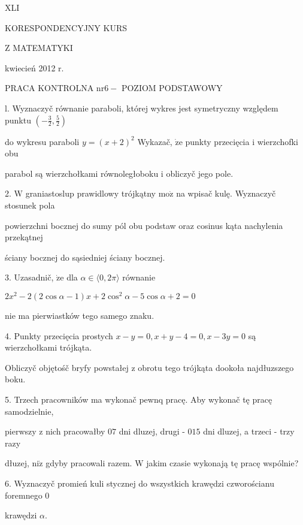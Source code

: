 \documentclass[a4paper,12pt]{article}
\begin{document}
XLI

KORESPONDENCYJNY KURS

Z MATEMATYKI

kwiecień 2012 r.

PRACA KONTROLNA $\mathrm{n}\mathrm{r} 6-$ POZIOM PODSTAWOWY

l. Wyznaczyč równanie paraboli, której wykres jest symetryczny względem punktu $(-\displaystyle \frac{3}{2},\frac{5}{2})$

do wykresu paraboli $y = (x+2)^{2}$ Wykazač, $\dot{\mathrm{z}}\mathrm{e}$ punkty przecięcia $\mathrm{i}$ wierzchofki obu

parabol są wierzchołkami równoległoboku $\mathrm{i}$ obliczyč jego pole.

2. $\mathrm{W}$ graniastoslup prawidlowy trójkątny $\mathrm{m}\mathrm{o}\dot{\mathrm{z}}$ na wpisač kulę. Wyznaczyč stosunek pola

powierzchni bocznej do sumy pól obu podstaw oraz cosinus kąta nachylenia przekątnej

ściany bocznej do sąsiedniej ściany bocznej.

3. Uzasadnič, $\dot{\mathrm{z}}\mathrm{e}$ dla $\alpha\in\langle 0,  2\pi\rangle$ równanie

$2x^{2}-2(2\cos\alpha-1)x+2\cos^{2}\alpha-5\cos\alpha+2=0$

nie ma pierwiastków tego samego znaku.

4. Punkty przecięcia prostych $x-y=0, x+y-4=0, x-3y=0$ są wierzchołkami trójkąta.

Obliczyč objętośč bryfy powstałej $\mathrm{z}$ obrotu tego trójkąta dookoła najdłuzszego boku.

5. Trzech pracowników ma wykonač pewnq pracę. Aby wykonač tę pracę samodzielnie,

pierwszy $\mathrm{z}$ nich pracowałby $07$ dni dluzej, drugi - $015$ dni dluzej, a trzeci - trzy razy

dłuzej, $\mathrm{n}\mathrm{i}\dot{\mathrm{z}}$ gdyby pracowali razem. $\mathrm{W}$ jakim czasie wykonają tę pracę wspólnie?

6. Wyznaczyč promień kuli stycznej do wszystkich krawędzi czworościanu foremnego $0$

krawędzi $\alpha.$
\end{document}
